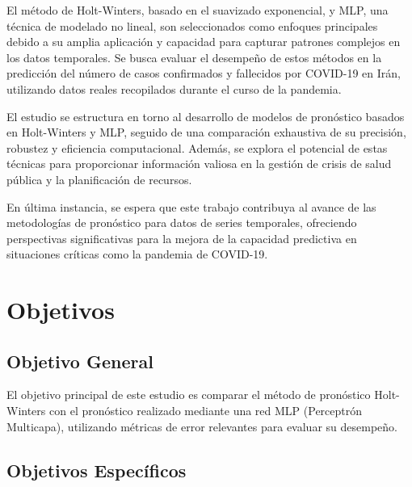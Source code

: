 \documentclass[
  us-letterpaper,
]{scrreprt}
\theoremstyle{plain}
\theoremstyle{definition}
\theoremstyle{definition}
\theoremstyle{plain}
\theoremstyle{remark}
\begin{document}
El método de Holt-Winters, basado en el suavizado exponencial, y MLP,
una técnica de modelado no lineal, son seleccionados como enfoques
principales debido a su amplia aplicación y capacidad para capturar
patrones complejos en los datos temporales. Se busca evaluar el
desempeño de estos métodos en la predicción del número de casos
confirmados y fallecidos por COVID-19 en Irán, utilizando datos reales
recopilados durante el curso de la pandemia.

El estudio se estructura en torno al desarrollo de modelos de pronóstico
basados en Holt-Winters y MLP, seguido de una comparación exhaustiva de
su precisión, robustez y eficiencia computacional. Además, se explora el
potencial de estas técnicas para proporcionar información valiosa en la
gestión de crisis de salud pública y la planificación de recursos.

En última instancia, se espera que este trabajo contribuya al avance de
las metodologías de pronóstico para datos de series temporales,
ofreciendo perspectivas significativas para la mejora de la capacidad
predictiva en situaciones críticas como la pandemia de COVID-19.


\chapter*{Objetivos}\label{objetivos}


\section*{Objetivo General}\label{objetivo-general}


El objetivo principal de este estudio es comparar el método de
pronóstico Holt-Winters con el pronóstico realizado mediante una red MLP
(Perceptrón Multicapa), utilizando métricas de error relevantes para
evaluar su desempeño.

\section*{Objetivos Específicos}\label{objetivos-especuxedficos}

\end{document}
